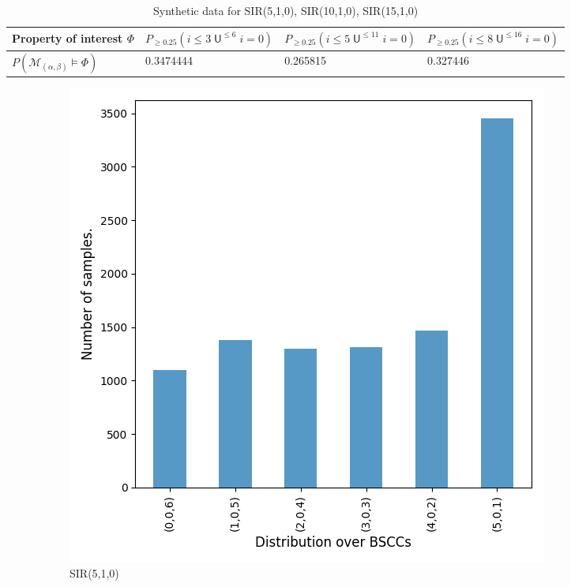 \begin{table}[H]
\begin{adjustwidth}{-2cm}{}
\begin{tabular}{|l|l|l|l|}
            Property of interest $\Phi$                  & $P_{\geq 0.25} (i\leq3\; \mathsf{U}^{\leq 6}\;i=0)$ & $P_{\geq 0.25} (i\leq 5\;\mathsf{U}^{\leq 11}\;i=0)$ & $P_{\geq 0.25} (i\leq8\; \mathsf{U}^{\leq 16}\;i=0)$ \\ \hline
            $P(\mathcal{M}_{(\alpha,\beta)}\models\Phi)$ & 0.3474444                                           & 0.265815                                             & 0.327446                                             \\ \hline
        \end{tabular}
    \end{adjustwidth}
    \caption{Synthetic data for SIR(5,1,0), SIR(10,1,0), SIR(15,1,0)}
\end{table}

\begin{figure}[H]
    \centering
    \begin{subfigure}{0.3\textwidth}
        \centering
        \includegraphics[width=\linewidth]{figures/sir510_data.png}
        \caption{SIR(5,1,0)}
    \end{subfigure}
    \hfill
    \begin{subfigure}{0.3\textwidth}
        \centering

\end{subfigure}
\end{figure}
